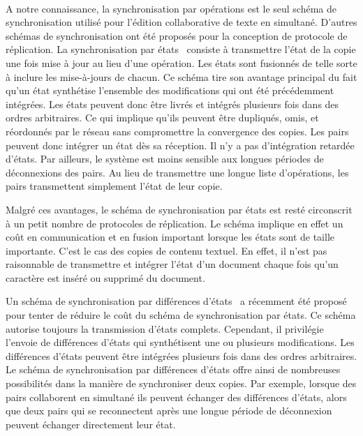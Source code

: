 \paragraph{}A notre connaissance, la synchronisation par opérations est le seul schéma de synchronisation utilisé pour l'édition collaborative de texte en simultané.
D'autres schémas de synchronisation ont été proposés pour la conception de protocole de réplication.
La synchronisation par états~\autocite{shapiro_2011_crdt} consiste à transmettre l'état de la copie une fois mise à jour au lieu d'une opération.
Les états sont fusionnés de telle sorte à inclure les mise-à-jours de chacun.
Ce schéma tire son avantage principal du fait qu'un état synthétise l'ensemble des modifications qui ont été précédemment intégrées.
Les états peuvent donc être livrés et intégrés plusieurs fois dans des ordres arbitraires.
Ce qui implique qu'ils peuvent être dupliqués, omis, et réordonnés par le réseau sans compromettre la convergence des copies.
Les pairs peuvent donc intégrer un état dès sa réception.
Il n'y a pas d'intégration retardée d'états.
Par ailleurs, le système est moins sensible aux longues périodes de déconnexions des pairs.
Au lieu de transmettre une longue liste d'opérations, les pairs transmettent simplement l'état de leur copie.

Malgré ces avantages, le schéma de synchronisation par états est resté circonscrit à un petit nombre de protocoles de réplication.
Le schéma implique en effet un coût en communication et en fusion important lorsque les états sont de taille importante.
C'est le cas des copies de contenu textuel.
En effet, il n'est pas raisonnable de transmettre et intégrer l'état d'un document chaque fois qu'un caractère est inséré ou supprimé du document.

Un schéma de synchronisation par différences d'états~\autocite{almeida_2018_delta-crdt-revisited} a récemment été proposé pour tenter de réduire le coût du schéma de synchronisation par états.
Ce schéma autorise toujours la transmission d'états complets.
Cependant, il privilégie l'envoie de différences d'états qui synthétisent une ou plusieurs modifications.
Les différences d'états peuvent être intégrées plusieurs fois dans des ordres arbitraires.
Le schéma de synchronisation par différences d'états offre ainsi de nombreuses possibilités dans la manière de synchroniser deux copies.
Par exemple, lorsque des pairs collaborent en simultané ils peuvent échanger des différences d'états, alors que deux pairs qui se reconnectent après une longue période de déconnexion peuvent échanger directement leur état.

